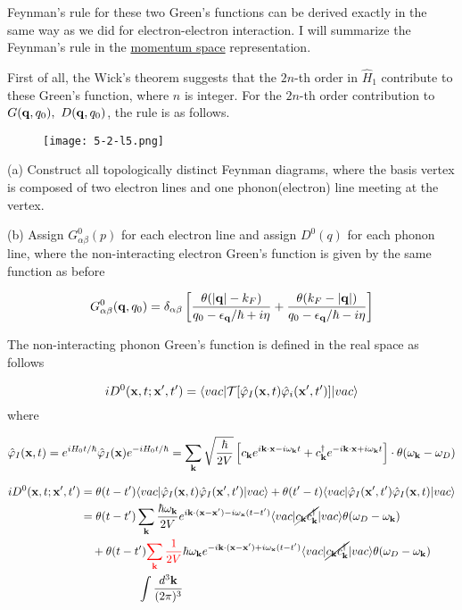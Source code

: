 
Feynman's rule for these two Green's functions can be derived exactly in the same way as we did for electron-electron interaction. I will summarize the Feynman's rule in the \uline{momentum space} representation. 

First of all, the Wick's theorem suggests that the $2n$-th order in $\hat{H}_1$ contribute to these Green's function, where $n$ is integer. For the $2n$-th order contribution to $G({\bf q},q_0),\ D({\bf q},q_0)$, the rule is as follows. 

\begin{wrapfigure}{l}{4cm}
\texttt{[image: 5-2-l5.png]}
\end{wrapfigure}
\noindent (a) Construct all topologically distinct Feynman diagrams, where the basis vertex is composed of two electron lines and one phonon(electron) line meeting at the vertex. 

\noindent (b) Assign $G_{\alpha\beta}^0(p)$ for each electron line and assign $D^0(q)$ for each phonon line, where the non-interacting electron Green's function is given by the same function as before

\[G_{\alpha\beta}^0({\bf q},q_0) = \delta_{\alpha\beta}\left[\frac{\theta(|{\bf q}|-k_F)}{q_0-\epsilon_{\bf q}/\hbar+i\eta} + \frac{\theta(k_F - |{\bf q}|)}{q_0-\epsilon_{\bf q}/\hbar-i\eta}\right] \]

The non-interacting phonon Green's function is defined in the real space as follows 

\[iD^0({\bf x},t;{\bf x'},t') = \langle vac|\mathcal{T}[\hat\varphi_I({\bf x},t)\hat\varphi_i({\bf x'},t')]|vac\rangle \]
where

\[\hat\varphi_I({\bf x},t) = e^{iH_0t/\hbar}\hat\varphi_I({\bf x})e^{-iH_0t/\hbar} = \sum_{\bf k}\sqrt{\frac{\hbar}{2V}}\left[c_{\bf k}e^{i{\bf k\cdot x} - i\omega_{\bf k}t} + c_{\bf k}^\dagger e^{-i{\bf k\cdot x} + i\omega_{\bf k}t}\right] \cdot\theta(\omega_{\bf k} - \omega_D)\]

\[\begin{split}
iD^0({\bf x},t;{\bf x'},t') &= \theta(t-t')\langle vac|\hat\varphi_I({\bf x},t)\hat\varphi_I({\bf x'},t')|vac\rangle + \theta(t'-t)\langle vac|\hat\varphi_I({\bf x'},t')\hat\varphi_I({\bf x},t)|vac\rangle\\
&= \theta(t-t')\sum_{\bf k}\frac{\hbar\omega_{\bf k}}{2V}e^{i{\bf k\cdot(x-x')}-i\omega_{\bf x}(t-t')}\langle vac|\cancel{c_{\bf k}c_{\bf k}^\dagger}|vac\rangle\theta(\omega_D-\omega_{\bf k})\\
&\ \ \  + \theta(t-t'){\color{red}{\sum_{\bf k}\frac{1}{2V}}}\hbar\omega_{\bf k}e^{-i{\bf k\cdot(x-x')}+i\omega_{\bf x}(t-t')}\langle vac|\cancel{c_{\bf k}c_{\bf k}^\dagger}|vac\rangle\theta(\omega_D-\omega_{\bf k})\\
&\quad\quad\quad\quad\quad\int \frac{d^3\bf k}{(2\pi)^3}\\
\end{split} \]

